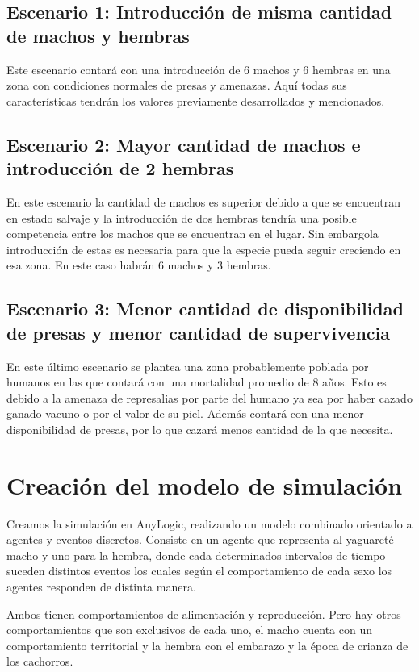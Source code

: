     \subsection{Escenario 1: Introducción de misma cantidad de machos y hembras}
        Este escenario contará con una introducción de 6 machos y 6 hembras en una zona con condiciones normales de presas y amenazas. Aquí todas sus características tendrán los valores previamente desarrollados y mencionados.
        
    \subsection{Escenario 2: Mayor cantidad de machos e introducción de 2 hembras}
        En este escenario la cantidad de machos es superior debido a que se encuentran en estado salvaje y la introducción de dos hembras tendría una posible competencia entre los machos que se encuentran en el lugar. Sin embargola introducción de estas es necesaria para que la especie pueda seguir creciendo en esa zona. En este caso habrán 6 machos y 3 hembras.
        
    \subsection{Escenario 3: Menor cantidad de disponibilidad de presas y menor cantidad de supervivencia}
        En este último escenario se plantea una zona probablemente poblada por humanos en las que contará con una mortalidad promedio de 8 años. Esto es debido a la amenaza de represalias por parte del humano ya sea por haber cazado ganado vacuno o por el valor de su piel. Además contará con una menor disponibilidad de presas, por lo que cazará menos cantidad de la que necesita.
    
    
\section{Creación del modelo de simulación}
    Creamos la simulación en AnyLogic, realizando un modelo combinado orientado a agentes y eventos discretos. Consiste en un agente que representa al yaguareté macho y uno para la hembra, donde cada determinados intervalos de tiempo suceden distintos eventos los cuales según el comportamiento de cada sexo los agentes responden de distinta manera.
    
    Ambos tienen comportamientos de alimentación y reproducción. Pero hay otros comportamientos que son exclusivos de cada uno, el macho cuenta con un comportamiento territorial y la hembra con el embarazo y la época de crianza de los cachorros.


